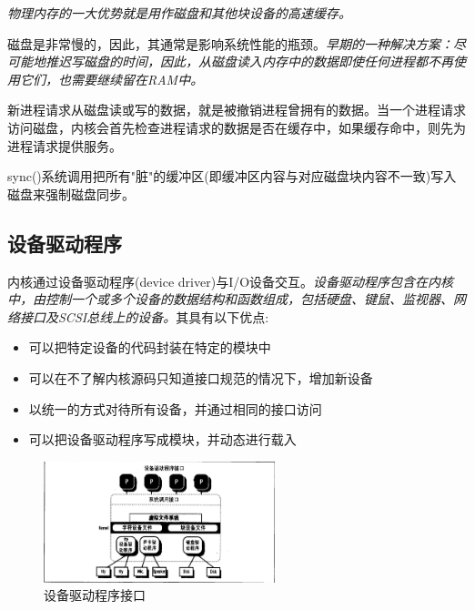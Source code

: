     \emph{物理内存的一大优势就是用作磁盘和其他块设备的高速缓存。}

    磁盘是非常慢的，因此，其通常是影响系统性能的瓶颈。\emph{早期的一种解决方案：尽可能地推迟写磁盘的时间，因此，从磁盘读入内存中的数据即使任何进程都不再使用它们，也需要继续留在RAM中。}

    新进程请求从磁盘读或写的数据，就是被撤销进程曾拥有的数据。当一个进程请求访问磁盘，内核会首先检查进程请求的数据是否在缓存中，如果缓存命中，则先为进程请求提供服务。

    sync()系统调用把所有"脏"的缓冲区(即缓冲区内容与对应磁盘块内容不一致)写入磁盘来强制磁盘同步。

\subsection{设备驱动程序}

    内核通过设备驱动程序(device driver)与I/O设备交互。\emph{设备驱动程序包含在内核中，由控制一个或多个设备的数据结构和函数组成，包括硬盘、键鼠、监视器、网络接口及SCSI总线上的设备。}其具有以下优点:

\begin{itemize}
    \item 可以把特定设备的代码封装在特定的模块中
    \item 可以在不了解内核源码只知道接口规范的情况下，增加新设备
    \item 以统一的方式对待所有设备，并通过相同的接口访问
    \item 可以把设备驱动程序写成模块，并动态进行载入
\end{itemize}

\begin{figure}[!htbp]
    \centering
    \includegraphics[width=0.6\textwidth]{image/chapter01/设备驱动程序接口.png}
    \caption{设备驱动程序接口}
\end{figure}

